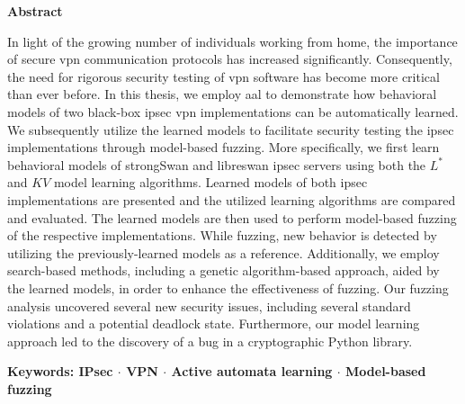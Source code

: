 \vspace{35mm}


\pagestyle{plain}
\newpage

\vspace*{25mm}

\begin{changemargin}{15mm}{15mm}
\begin{center}
{\Large\bfseries Abstract}
\end{center}
\vspace*{7mm}

In light of the growing number of individuals working from home, the importance of secure \acl{vpn} communication protocols has increased significantly. Consequently, the need for rigorous security testing of \acl{vpn} software has become more critical than ever before. 
In this thesis, we employ \acl{aal} to demonstrate how behavioral models of two black-box \acl{ipsec} \acl{vpn} implementations can be automatically learned. We subsequently utilize the learned models to facilitate security testing the \acl{ipsec} implementations through model-based fuzzing. 
More specifically, we first learn behavioral models of strongSwan and libreswan \acl{ipsec} servers using both the $L^*$ and $KV$ model learning algorithms. Learned models of both \acl{ipsec} implementations are presented and the utilized learning algorithms are compared and evaluated. The learned models are then used to perform model-based fuzzing of the respective implementations. While fuzzing, new behavior is detected by utilizing the previously-learned models as a reference. Additionally, we employ search-based methods, including a genetic algorithm-based approach, aided by the learned models, in order to enhance the effectiveness of fuzzing. Our fuzzing analysis uncovered several new security issues, including several standard violations and a potential deadlock state. Furthermore, our model learning approach led to the discovery of a bug in a cryptographic Python library.

 
\vspace{5mm}
\noindent
{\large\bfseries Keywords: IPsec $\cdot$ VPN $\cdot$ Active automata learning $\cdot$ Model-based fuzzing}




\newpage

\vspace*{10mm}


\end{changemargin}
